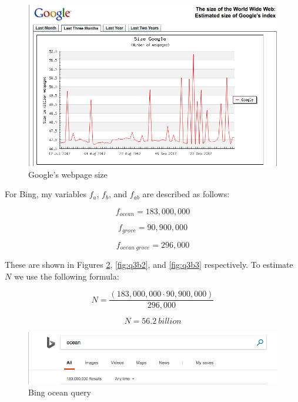 \documentclass[letterpaper,11pt]{article}
\begin{document}
\begin{figure}[h]
\centering
\includegraphics[scale=0.4]{googlewww.png}
\caption{Google's webpage size}
\label{fig:q3gwww}
\end{figure}

For Bing, my variables $f_{a}$, $f_{b}$, and $f_{ab}$ are described as follows:

\begin{equation*}
	f_{ocean} = 183,000,000
\end{equation*}

\begin{equation*}
	f_{grove} = 90,900,000
\end{equation*}

\begin{equation*}
	f_{ocean\ grove} = 296,000
\end{equation*}

These are shown in Figures \ref{fig:q3b1}, \ref{fig:q3b2}, and \ref{fig:q3b3} respectively. To estimate $N$ we use the following formula:

\begin{equation*}
	N = \frac{(183,000,000 \cdot 90,900,000)}{296,000}
\end{equation*}

\begin{equation*}
	N =  56.2 \ billion
\end{equation*}

\begin{figure}[h]
\centering
\includegraphics[scale=0.4]{bing1.png}
\caption{Bing ocean query}
\label{fig:q3b1}
\end{figure}
\end{document}
